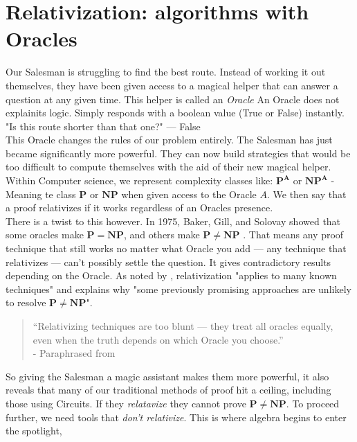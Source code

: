 \documentclass[12pt]{report}
\begin{document}
\section{Relativization: algorithms with Oracles}
Our Salesman is struggling to find the best route.
Instead of working it out themselves, they have been given access to a magical helper that can answer a question at any given time.
This helper is called an \textit{Oracle}
An Oracle does not explainits logic.
Simply responds with a boolean value (True or False) instantly.\\
"Is this route shorter than that one?" --- False\\
This Oracle changes the rules of our problem entirely.
The Salesman has just became significantly more powerful.
They can now build strategies that would be too difficult to compute themselves with the aid of their new magical helper.
Within Computer science, we represent complexity classes like: $\mathbf{P^A}$ or $\mathbf{NP^A}$ - Meaning te class $\mathbf{P}$ or $\mathbf{NP}$ when given access to the Oracle $A$.
We then say that a proof relativizes if it works regardless of an Oracles presence.\\
There is a twist to this however.
In 1975, Baker, Gill, and Solovay showed that some oracles make $\mathbf{P = NP}$, and others make $\mathbf{P \ne NP}$ \citep{baker1975relativizations}.
That means any proof technique that still works no matter what Oracle you add — any technique that relativizes — can’t possibly settle the question. It gives contradictory results depending on the Oracle.
As noted by \cite{arora2009}, relativization "applies to many known techniques" and explains why "some previously promising approaches are unlikely to resolve $\mathbf{P \ne NP}$".
\begin{quote}
    “Relativizing techniques are too blunt — they treat all oracles equally, even when the truth depends on which Oracle you choose.”\\
    - Paraphrased from \cite{baker1975relativizations}
\end{quote}
So giving the Salesman a magic assistant makes them more powerful, it also reveals that many of our traditional methods of proof hit a ceiling, including those using Circuits.
If they \textit{relatavize} they cannot prove  $\mathbf{P \ne NP}$.
To proceed further, we need tools that \textit{don't relativize}.
This is where algebra begins to enter the spotlight,
\end{document}
